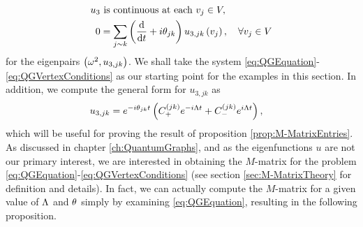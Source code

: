 \begin{subequations} \label{eq:QGVertexConditions}
	\begin{align}
		u_3 &\text{ is continuous at each } v_j\in V, \\
		0 &= \sum_{j\sim k} \left( \dfrac{\mathrm{d}}{\mathrm{d}t} + i\theta_{jk} \right)u_{3,jk}\left( v_j \right), \quad\forall v_j\in V
	\end{align}
\end{subequations}
for the eigenpairs $\left( \omega^2, u_{3,jk} \right)$.
We shall take the system \eqref{eq:QGEquation}-\eqref{eq:QGVertexConditions} as our starting point for the examples in this section.
In addition, we compute the general form for $u_{3,jk}$ as
\begin{align} \label{eq:CurlEdgeEqnGenSol}
	u_{3,jk} &= e^{-i\theta_{jk}t}\left(  C_{+}^{(jk)}e^{-i\Lambda t} + C_{-}^{(jk)}e^{i\Lambda t}  \right),
\end{align}
which will be useful for proving the result of proposition \ref{prop:M-MatrixEntries}. 
As discussed in chapter \ref{ch:QuantumGraphs}, and as the eigenfunctions $u$ are not our primary interest, we are interested in obtaining the $M$-matrix for the problem \eqref{eq:QGEquation}-\eqref{eq:QGVertexConditions} (see section \ref{sec:M-MatrixTheory} for definition and details).
In fact, we can actually compute the $M$-matrix for a given value of $\Lambda$ and $\theta$ simply by examining \eqref{eq:QGEquation}, resulting in the following proposition.
